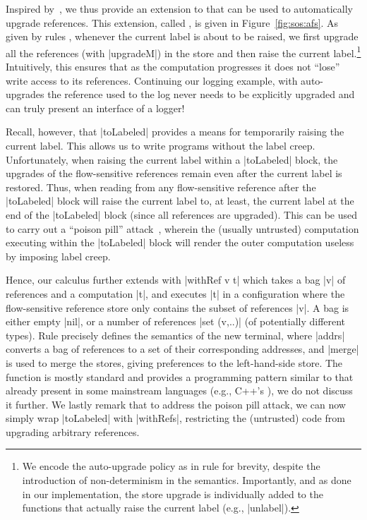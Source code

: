 Inspired by~\citep{Hedin13}, we thus provide an extension to \liofs{} that can
be used to automatically upgrade references.
%
This extension, called \lioafs{}, is given in Figure~\ref{fig:sos:afs}.
%
As given by rules , whenever the current label is about
to be raised, we first upgrade all the references (with |upgradeM|) in the
store and then raise the current label.\footnote{
We encode the auto-upgrade policy as in rule  for
brevity, despite the introduction of non-determinism in the semantics.
%
Importantly, and as done in our implementation, the store upgrade is
individually added to the functions that actually raise the current label
(e.g., |unlabel|).
}
%
Intuitively, this ensures that as the computation progresses it does not
``lose'' write access to its references.
%
Continuing our logging example, with auto-upgrades the reference used to the log
never needs to be explicitly upgraded and can truly present an interface of a
logger!

Recall, however, that |toLabeled| provides a means for temporarily raising the
current label.
%
This allows us to write programs without the label creep.
%
Unfortunately, when raising the current label within a |toLabeled| block, the
upgrades of the flow-sensitive references remain even after the current label
is restored.
%
Thus, when reading from any flow-sensitive reference after the |toLabeled|
block will raise the current label to, at least, the current label at the end
of the |toLabeled| block (since all references are upgraded).
%
This can be used to carry out a ``poison pill'' attack~, wherein
the (usually untrusted) computation executing within the |toLabeled| block will
render the outer computation useless by imposing label creep.

Hence, our \lioafs{} calculus further extends \liofs{} with |withRef v t| which
takes a bag |v| of references and a computation |t|, and executes |t| in a
configuration where the flow-sensitive reference store only contains the subset
of references |v|.
%
A bag is either empty |nil|, or a number of references |set (v,..)| (of
potentially different types).
%
Rule  precisely defines the semantics of the new terminal,
where |addrs| converts a bag of references to a set of their corresponding
addresses, and |merge| is used to merge the stores, giving preferences to the
left-hand-side store.
%
The function is mostly standard and provides a programming pattern similar to
that already present in some mainstream languages (e.g., C++'s ),
we do not discuss it further.
%
We lastly remark that to address the poison pill attack, we can now simply wrap
|toLabeled| with |withRefs|, restricting the (untrusted) code from upgrading
arbitrary references.


